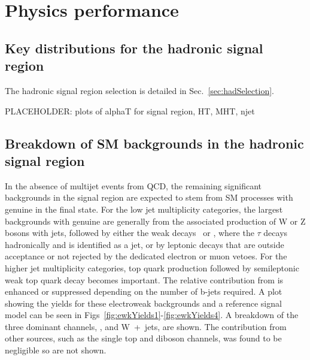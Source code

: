 \section{Physics performance}
\label{sec:physics}

\subsection{Key distributions for the hadronic signal
  region\label{sec:mc-data-comp}}

The hadronic signal region selection is detailed in Sec.~\ref{sec:hadSelection}.

PLACEHOLDER: plots of alphaT for signal region, HT, MHT, njet

\subsection{Breakdown of SM backgrounds in the hadronic signal
  region\label{sec:bkgd-comp}}

In the absence of multijet events from QCD, the remaining significant
backgrounds in the signal region are expected to stem from SM
processes with genuine \met in the final state. For the low jet
multiplicity categories, the largest backgrounds with genuine \met are
generally from the associated production of W or Z bosons with jets,
followed by either the weak decays \znunu\ or \wtaunu, where the
$\tau$ decays hadronically and is identified as a jet, or by leptonic
decays that are outside acceptance or not rejected by the dedicated
electron or muon vetoes. For the higher jet multiplicity categories,
top quark production followed by semileptonic weak top quark decay
becomes important. The relative contribution from \ttbar is enhanced
or suppressed depending on the number of b-jets required. 
A plot showing the yields for these electroweak backgrounds and a reference
signal model can be seen in Figs~\ref{fig:ewkYields1}-\ref{fig:ewkYields4}. 
A breakdown of the three
dominant channels, \zInv , \ttbar and W~+~jets, are shown. The contribution from
other sources, such as the single top and diboson channels, was found to be
negligible so are not shown.

